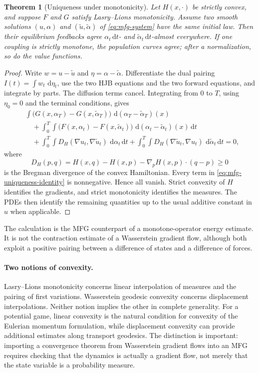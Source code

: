 \documentclass[11pt,a4paper]{article}
\newtheorem{theorem}{Theorem}[section]
\theoremstyle{definition}
\newcommand{\dd}{\,\mathrm d}
\newcommand{\al}{\alpha}
\begin{document}
\begin{theorem}[Uniqueness under monotonicity]
\label{thm:mfg-uniqueness}
Let $H(x,\cdot)$ be strictly convex, and suppose $F$ and $G$ satisfy
Lasry--Lions monotonicity.  Assume two smooth solutions
$(u,\al)$ and $(\widetilde u,\widetilde\al)$ of
\eqref{eq:mfg-system} have the same initial law.  Then their equilibrium
feedbacks agree $\al_t\dd t$- and
$\widetilde\al_t\dd t$-almost everywhere.  If one coupling is strictly
monotone, the population curves agree; after a normalization, so do the value
functions.
\end{theorem}

\begin{proof}
Write $w=u-\widetilde u$ and
$\eta=\al-\widetilde\al$.  Differentiate the dual pairing
$I(t)=\int w_t\,\dd\eta_t$, use the two HJB equations and the two forward
equations, and integrate by parts.  The diffusion terms cancel.  Integrating
from $0$ to $T$, using $\eta_0=0$ and the terminal conditions, gives
\begin{align}\label{eq:mfg-uniqueness-identity}
&\int\bigl(G(x,\al_T)-G(x,\widetilde\al_T)\bigr)
     \,\dd(\al_T-\widetilde\al_T)(x)\\
&\quad+\int_0^T\!\int
  \bigl(F(x,\al_t)-F(x,\widetilde\al_t)\bigr)
  \,\dd(\al_t-\widetilde\al_t)(x)\dd t\nonumber\\
&\quad+\int_0^T\!\int
  D_H(\nabla u_t,\nabla\widetilde u_t)\,\dd\al_t\dd t
  +\int_0^T\!\int
  D_H(\nabla\widetilde u_t,\nabla u_t)
  \,\dd\widetilde\al_t\dd t=0,\nonumber
\end{align}
where
\[
  D_H(p,q)=H(x,q)-H(x,p)-\nabla_pH(x,p)\cdot(q-p)\geq0
\]
is the Bregman divergence of the convex Hamiltonian.  Every term in
\eqref{eq:mfg-uniqueness-identity} is nonnegative.  Hence all vanish.  Strict
convexity of $H$ identifies the gradients, and strict monotonicity identifies
the measures.  The PDEs then identify the remaining quantities up to the usual
additive constant in $u$ when applicable.
\end{proof}

The calculation is the MFG counterpart of a monotone-operator energy estimate.
It is not the contraction estimate of a Wasserstein gradient flow, although
both exploit a positive pairing between a difference of states and a
difference of forces.

\paragraph{Two notions of convexity.}
Lasry--Lions monotonicity concerns linear interpolation of measures and the
pairing of first variations.  Wasserstein geodesic convexity concerns
displacement interpolations.  Neither notion implies the other in complete
generality.  For a potential game, linear convexity is the natural condition
for convexity of the Eulerian momentum formulation, while displacement
convexity can provide additional estimates along transport geodesics.  The
distinction is important: importing a convergence theorem from Wasserstein
gradient flows into an MFG requires checking that the dynamics is actually a
gradient flow, not merely that the state variable is a probability measure.
\end{document}
